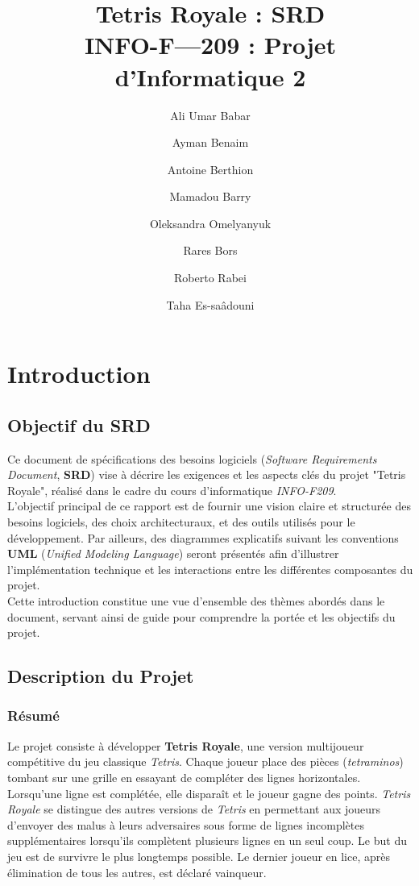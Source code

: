 \documentclass{report}
\title{Tetris Royale : SRD \\ INFO-F—209 : Projet d'Informatique 2}
\author{
Ali Umar Babar \and
Ayman Benaim \and
Antoine Berthion \and
Mamadou Barry \and
Oleksandra Omelyanyuk \and
Rares Bors \and
Roberto Rabei \and
Taha Es-saâdouni
}
\begin{document}
\maketitle
\tableofcontents

\chapter{Introduction}
\label{chap:intro}
\section{Objectif du SRD}

Ce document de spécifications des besoins logiciels (\textit{Software Requirements Document}, \textbf{SRD}) vise à décrire les exigences et les aspects clés du projet "Tetris Royale", réalisé dans le cadre du cours d'informatique \textit{INFO-F209}. \\

\noindent L'objectif principal de ce rapport est de fournir une vision claire et structurée des besoins logiciels, des choix architecturaux, et des outils utilisés pour le développement. Par ailleurs, des diagrammes explicatifs suivant les conventions \textbf{UML} (\textit{Unified Modeling Language}) seront présentés afin d'illustrer l'implémentation technique et les interactions entre les différentes composantes du projet. \\

\noindent Cette introduction constitue une vue d'ensemble des thèmes abordés dans le document, servant ainsi de guide pour comprendre la portée et les objectifs du projet.

\section{Description du Projet}
\label{sec:description}

\subsection{Résumé}
\noindent Le projet consiste à développer \textbf{Tetris Royale}, une version multijoueur compétitive du jeu classique \emph{Tetris}. Chaque joueur place des pièces (\emph{tetraminos}) tombant sur une grille en essayant de compléter des lignes horizontales. Lorsqu'une ligne est complétée, elle disparaît et le joueur gagne des points. \emph{Tetris Royale} se distingue des autres versions de \emph{Tetris} en permettant aux joueurs d'envoyer des malus à leurs adversaires sous forme de lignes incomplètes supplémentaires lorsqu'ils complètent plusieurs lignes en un seul coup. Le but du jeu est de survivre le plus longtemps possible. Le dernier joueur en lice, après élimination de tous les autres, est déclaré vainqueur.
\end{document}
